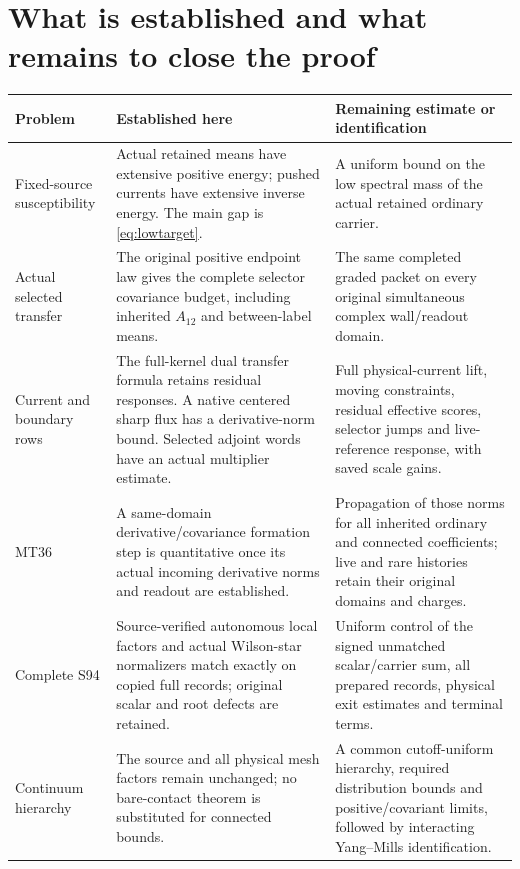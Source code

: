 \documentclass[11pt,letterpaper]{article}
\theoremstyle{remark}\newtheorem{remark}[theorem]{Remark}
\begin{document}
\clearpage
\section{What is established and what remains to close the proof}

\begin{longtable}{>{\raggedright\arraybackslash}p{}>{\raggedright\arraybackslash}p{}>{\raggedright\arraybackslash}p{}}
\toprule
Problem & Established here & Remaining estimate or identification\\
\midrule
\endhead
Fixed-source susceptibility &
Actual retained means have extensive positive energy; pushed currents have extensive inverse energy. The main gap is \eqref{eq:lowtarget}. &
A uniform bound on the low spectral mass of the actual retained ordinary carrier.\\[5pt]
Actual selected transfer &
The original positive endpoint law gives the complete selector covariance budget, including inherited $A_{12}$ and between-label means. &
The same completed graded packet on every original simultaneous complex wall/readout domain.\\[5pt]
Current and boundary rows &
The full-kernel dual transfer formula retains residual responses. A native centered sharp flux has a derivative-norm bound. Selected adjoint words have an actual multiplier estimate. &
Full physical-current lift, moving constraints, residual effective scores, selector jumps and live-reference response, with saved scale gains.\\[5pt]
MT36 &
A same-domain derivative/covariance formation step is quantitative once its actual incoming derivative norms and readout are established. &
Propagation of those norms for all inherited ordinary and connected coefficients; live and rare histories retain their original domains and charges.\\[5pt]
Complete S94 &
Source-verified autonomous local factors and actual Wilson-star normalizers match exactly on copied full records; original scalar and root defects are retained. &
Uniform control of the signed unmatched scalar/carrier sum, all prepared records, physical exit estimates and terminal terms.\\[5pt]
Continuum hierarchy &
The source and all physical mesh factors remain unchanged; no bare-contact theorem is substituted for connected bounds. &
A common cutoff-uniform hierarchy, required distribution bounds and positive/covariant limits, followed by interacting Yang--Mills identification.\\
\bottomrule
\end{longtable}
\end{document}
